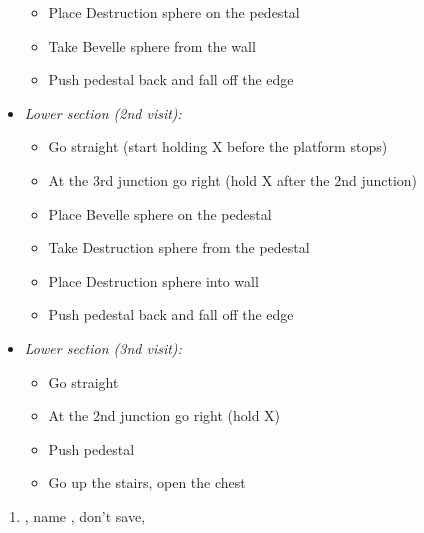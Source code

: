 \begin{trial}
\begin{itemize}
\begin{itemize}
            \item Place Destruction sphere on the pedestal
            \item Take Bevelle sphere from the wall
            \item Push pedestal back and fall off the edge
        \end{itemize}
        \item \textit{Lower section (2nd visit):}
        \begin{itemize}
            \item Go straight (start holding X before the platform stops)
            \item At the 3rd junction go right (hold X after the 2nd junction)
            \item Place Bevelle sphere on the pedestal
            \item Take Destruction sphere from the pedestal
            \item Place Destruction sphere into wall
            \item Push pedestal back and fall off the edge
        \end{itemize}
        \item \textit{Lower section (3nd visit):}
        \begin{itemize}
            \item Go straight
            \item At the 2nd junction go right (hold X)
            \item Push pedestal
            \item Go up the stairs, open the chest
        \end{itemize}
    \end{itemize}
\end{trial}
\begin{enumerate}[resume]
    \item \sd, name \bahamut, don't save, \sd
\end{enumerate}
\wincb\lossnp\bothnp\winnpsingle\lossnpsingle\bothnpsingle
